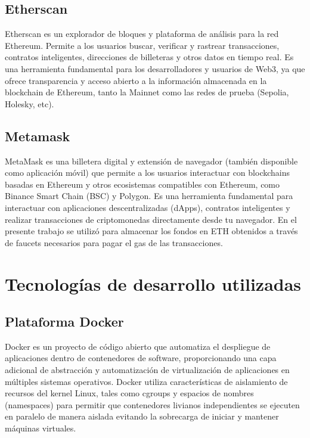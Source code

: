 \subsection{Etherscan}

Etherscan \cite{etherscan} es un explorador de bloques y plataforma de análisis para la red Ethereum. Permite a los usuarios buscar, verificar y rastrear transacciones, contratos inteligentes, direcciones de billeteras y otros datos en tiempo real. Es una herramienta fundamental para los desarrolladores y usuarios de Web3, ya que ofrece transparencia y acceso abierto a la información almacenada en la blockchain de Ethereum, tanto la Mainnet como las redes de prueba (Sepolia, Holesky, etc).

\subsection{Metamask}

MetaMask \cite{metamask} es una billetera digital y extensión de navegador (también disponible como aplicación móvil) que permite a los usuarios interactuar con blockchains basadas en Ethereum y otros ecosistemas compatibles con Ethereum, como Binance Smart Chain (BSC) y Polygon. Es una herramienta fundamental para interactuar con aplicaciones descentralizadas (dApps), contratos inteligentes y realizar transacciones de criptomonedas directamente desde tu navegador.
En el presente trabajo se utilizó para almacenar los fondos en ETH obtenidos a través de faucets necesarios para pagar el gas de las transacciones.

\section{Tecnologías de desarrollo utilizadas}




\subsection{Plataforma Docker}

Docker \cite{docker_website} es un proyecto de código abierto que automatiza el despliegue de aplicaciones dentro de contenedores de software, proporcionando una capa adicional de abstracción y automatización de virtualización de aplicaciones en múltiples sistemas operativos. Docker utiliza características de aislamiento de recursos del kernel Linux, tales como cgroups y espacios de nombres (namespaces) para permitir que contenedores livianos independientes se ejecuten en paralelo de manera aislada evitando la sobrecarga de iniciar y mantener máquinas virtuales.

